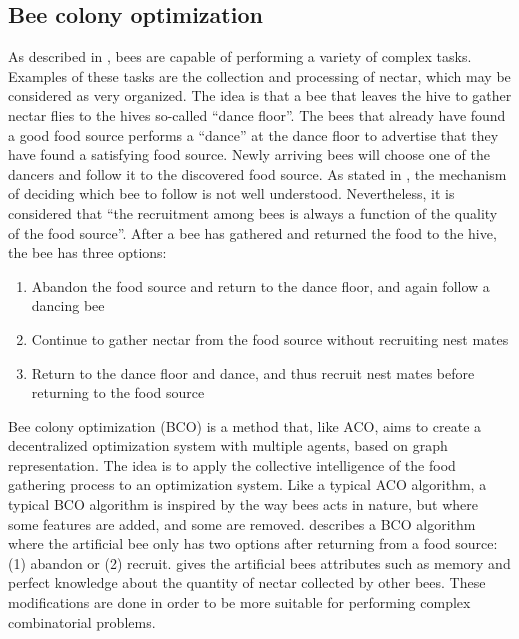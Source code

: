 \subsection{Bee colony optimization}
\label{subsec:BCO}
As described in \citet{lucic03}, bees are capable of performing a variety of complex tasks. Examples of these tasks are the collection and processing of nectar, which may be considered as very organized. The idea is that a bee that leaves the hive to gather nectar flies to the hives so-called ``dance floor''. The bees that already have found a good food source performs a ``dance'' at the dance floor to advertise that they have found a satisfying food source. Newly arriving bees will choose one of the dancers and follow it to the discovered food source. As stated in \citet{lucic03}, the mechanism of deciding which bee to follow is not well understood.  Nevertheless, it is considered that ``the recruitment among bees is always a function of the quality of the food source''. After a bee has gathered and returned the food to the hive, the bee has three options\citep{lucic03}:

\begin{enumerate}
  \item Abandon the food source and return to the dance floor, and again follow a dancing bee
  \item Continue to gather nectar from the food source without recruiting nest mates
  \item Return to the dance floor and dance, and thus recruit nest mates before returning to the food source
\end{enumerate}

Bee colony optimization (BCO) is a method that, like ACO, aims to create a decentralized optimization system with multiple agents, based on graph representation. The idea is to apply the collective intelligence of the food gathering process to an optimization system. Like a typical ACO algorithm, a typical BCO algorithm is inspired by the way bees acts in nature, but where some features are added, and some are removed. \citet{nikolic14} describes a BCO algorithm where the artificial bee only has two options after returning from a food source: (1) abandon or (2) recruit. \citet{lucic03} gives the artificial bees attributes such as memory and perfect knowledge about the quantity of nectar collected by other bees. These modifications are done in order to be more suitable for performing complex combinatorial problems.

